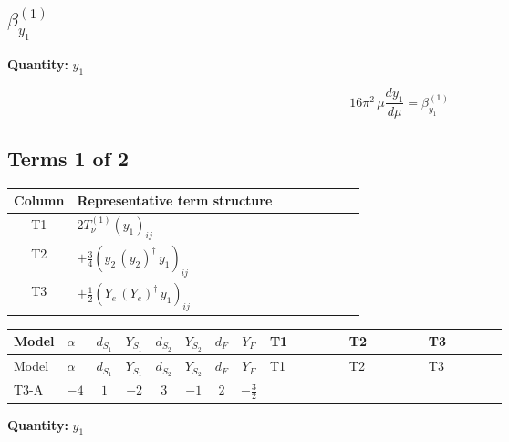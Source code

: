 \documentclass[8pt]{article}
\begin{document}
\begin{landscape}
\section*{$\beta_{y_1}^{(1)}$}
\noindent\textbf{Quantity: }$y_1$\par\smallskip
\[16\pi^2\,\mu\frac{d y_1}{d\mu}=\beta_{y_1}^{(1)}\]
\subsection*{Terms 1 of 2}
\begin{center}
\begin{tabular}{@{}c >{\raggedright\arraybackslash}p{0.82\linewidth}@{}}
\toprule
Column & Representative term structure \\
\midrule
T1 & \(\displaystyle 2 T_{\nu}^{(1)} \left({y_1}\right)_{ij}\) \\
\midrule
T2 & \(\displaystyle +\frac{3}{4} \left({y_2}\,\left({y_2}\right)^{\dagger}\,{y_1}\right)_{ij}\) \\
\midrule
T3 & \(\displaystyle +\frac{1}{2} \left({Y_e}\,\left({Y_e}\right)^{\dagger}\,{y_1}\right)_{ij}\) \\
\midrule
\bottomrule
\end{tabular}
\end{center}
\smallskip
\tiny
\begin{longtable}{@{}llcccccc >{\raggedright\arraybackslash}p{0.21\linewidth} >{\raggedright\arraybackslash}p{0.21\linewidth} >{\raggedright\arraybackslash}p{0.21\linewidth}@{}}
\toprule
Model & $\alpha$ & $d_{S_1}$ & $Y_{S_1}$ & $d_{S_2}$ & $Y_{S_2}$ & $d_F$ & $Y_F$ & T1 & T2 & T3 \\
\midrule
\endfirsthead
\toprule
Model & $\alpha$ & $d_{S_1}$ & $Y_{S_1}$ & $d_{S_2}$ & $Y_{S_2}$ & $d_F$ & $Y_F$ & T1 & T2 & T3 \\
\midrule
\endhead
T3-A & $-4$ & $1$ & $-2$ & $3$ & $-1$ & $2$ & $-\frac{3}{2}$ & \scriptsize\adjustbox{max width=\linewidth}{$\begin{gathered} 2 T_{\nu}^{(1)} \left({y_1}\right)_{ij}\end{gathered}$} & \scriptsize\adjustbox{max width=\linewidth}{$\begin{gathered} +\frac{3}{4} \left({y_2}\,\left({y_2}\right)^{\dagger}\,{y_1}\right)_{ij}\end{gathered}$} & \scriptsize\adjustbox{max width=\linewidth}{$\begin{gathered} +\frac{1}{2} \left({Y_e}\,\left({Y_e}\right)^{\dagger}\,{y_1}\right)_{ij}\end{gathered}$} \\
\midrule
\bottomrule
\end{longtable}
\clearpage
\noindent\textbf{Quantity: }$y_1$\par\smallskip

\end{landscape}
\end{document}
